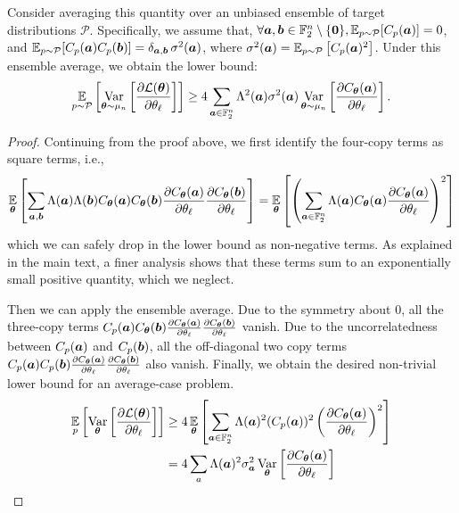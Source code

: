 \documentclass{article}
\theoremstyle{plain}
\theoremstyle{definition}
\theoremstyle{remark}
\begin{document}
Consider averaging this quantity over an unbiased ensemble of target distributions $\mathcal P$. Specifically, we assume that, $\forall{\bm{a}}, {\bm{b}} \in \mathbb{F}_2^n \setminus \{\bm{0}\},\operatorname*{\mathbb {E}}_{p\sim\mathcal {P}}[C_p({\bm{a}})]=0$, and $\operatorname*{\mathbb {E}}_{p\sim\mathcal {P}}\!\left[C_p({\bm{a}})C_p({\bm{b}})\right]=\delta_{{\bm{a}},{\bm{b}}}\,\sigma^2({\bm{a}})$, where $\sigma^2({\bm{a}}) = \operatorname*{\mathbb {E}}_{p \sim \mathcal{P}}\left[C_p({\bm{a}})^2\right]$. Under this ensemble average, we obtain the lower bound:
\begin{equation*}
\operatorname*{\mathbb{E}}_{p\sim\mathcal{P}} \left[\operatorname*{Var}_{{\bm{\theta}}\sim\mu_n}  
\left[\frac{\partial \mathcal{L}({\bm{\theta}})}{\partial \theta_\ell} \right]\right] \geq
4 \sum_{{\bm{a}}\in \mathbb{F}_2^n} \Lambda^2({\bm{a}})\sigma^2({\bm{a}})\operatorname*{Var}_{{\bm{\theta}}\sim\mu_n} \left[ \frac{\partial C_{\bm{\theta}}({\bm{a}})}{\partial \theta_\ell} \right].
\end{equation*}
\begin{proof}
Continuing from the proof above, we first identify the four-copy terms as square terms, i.e., 
\begin{equation*}
    \operatorname*{\mathbb{E}}_{{\bm{\theta}}} \left[ \sum_{{\bm{a}}, {\bm{b}}} \Lambda({\bm{a}}) \Lambda({\bm{b}}) C_{\bm{\theta}}({\bm{a}}) C_{\bm{\theta}}({\bm{b}}) \frac{\partial C_{\bm{\theta}}({\bm{a}})}{\partial \theta_\ell} \frac{\partial C_{\bm{\theta}}({\bm{b}})}{\partial \theta_\ell}\right] =\operatorname*{\mathbb{E}}_{{\bm{\theta}}}\left[ \left(\sum_{{\bm{a}} \in \mathbb{F}_2^n} \Lambda({\bm{a}}) C_{\bm{\theta}}({\bm{a}}) \frac{\partial C_{\bm{\theta}}({\bm{a}})}{\partial \theta_\ell}\right)^2\right]
\end{equation*}
which we can safely drop in the lower bound as non-negative terms. As explained in the main text, a finer analysis shows that these terms sum to an exponentially small positive quantity, which we neglect.

Then we can apply the ensemble average. Due to the symmetry about $0$, all the three-copy terms $C_p({\bm{a}}) C_{\bm{\theta}}({\bm{b}}) \frac{\partial C_{\bm{\theta}}({\bm{a}})}{\partial \theta_\ell} \frac{\partial C_{\bm{\theta}}({\bm{b}})}{\partial \theta_\ell}$ vanish. Due to the uncorrelatedness between $C_p({\bm{a}})$ and $C_p({\bm{b}})$, all the off-diagonal two copy terms $C_p({\bm{a}}) C_p({\bm{b}}) \frac{\partial C_{\bm{\theta}}({\bm{a}})}{\partial \theta_\ell} \frac{\partial C_{\bm{\theta}}({\bm{b}})}{\partial \theta_\ell}$ also vanish. Finally, we obtain the desired non-trivial lower bound for an average-case problem.
\begin{align*}
 \operatorname*{\mathbb{E}}_p\left[\operatorname*{Var}_{{\bm{\theta}}} \left[ \frac{\partial \mathcal{L}({\bm{\theta}})}{\partial \theta_\ell} \right]\right] &\geq 4 \operatorname*{\mathbb{E}}_{{\bm{\theta}}}  \left[ \sum_{{\bm{a}} \in \mathbb{F}_2^n} \Lambda({\bm{a}})^2 (C_p({\bm{a}}))^2 \left(\frac{\partial C_{\bm{\theta}}({\bm{a}})}{\partial \theta_\ell}\right)^2 \right] \\
 &= 4 \sum_a\Lambda({\bm{a}})^2\sigma_{\bm{a}}^2\operatorname*{Var}_{{\bm{\theta}}} \left[ \frac{\partial C_{\bm{\theta}}({\bm{a}})}{\partial \theta_\ell} \right] 
\end{align*}
\end{proof}
\end{document}
